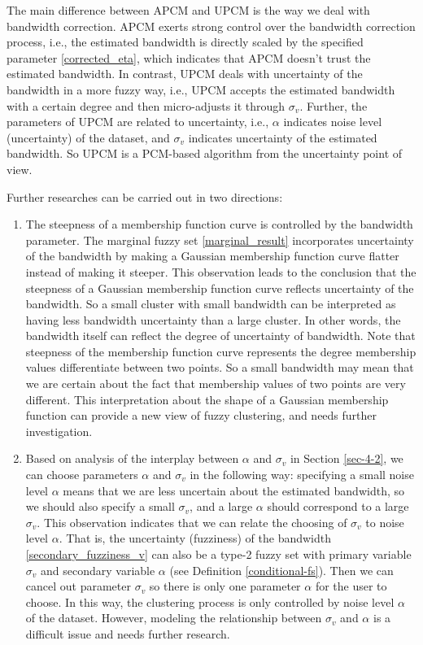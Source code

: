 \documentclass[journal,transmag]{IEEEtran}
\begin{document}
The main difference between APCM and UPCM is the way we deal with bandwidth correction.
APCM exerts strong control over the bandwidth correction process, i.e., the estimated bandwidth is directly scaled by the specified parameter \eqref{corrected_eta}, which indicates that APCM doesn't trust the estimated bandwidth. In contrast, UPCM deals with uncertainty of the bandwidth in a more fuzzy way, i.e., UPCM accepts the estimated bandwidth with a certain degree and then micro-adjusts it through $\sigma_v$. Further, the parameters of UPCM are related to uncertainty, i.e., $\alpha$ indicates noise level (uncertainty) of the dataset, and $\sigma_v$ indicates uncertainty of the estimated bandwidth. So UPCM is a PCM-based algorithm from the uncertainty point of view.

Further researches can be carried out in two directions:
\begin{enumerate}
\item The steepness of a membership function curve is controlled by the bandwidth parameter. The marginal fuzzy set \eqref{marginal_result} incorporates uncertainty of the bandwidth by making a Gaussian membership function curve flatter instead of making it steeper.
This observation leads to the conclusion that the steepness of a Gaussian membership function curve reflects uncertainty of the bandwidth. So a small cluster with small bandwidth can be interpreted as having less bandwidth uncertainty than a large cluster. In other words, the bandwidth itself can reflect the degree of uncertainty of bandwidth. Note that steepness of the membership function curve represents the degree membership values differentiate between two points. So a small bandwidth may mean that we are certain about the fact that membership values of two points are very different. This interpretation about the shape of a Gaussian  membership function can provide a new view of fuzzy clustering, and needs further investigation.
\item Based on analysis of the interplay between $\alpha$ and $\sigma_v$ in Section \ref{sec-4-2}, we can choose parameters $\alpha$ and $\sigma_v$ in the following way: specifying a small noise level $\alpha$ means that we are less uncertain about the estimated bandwidth, so we should also specify a small $\sigma_v$, and a large $\alpha$ should correspond to a large $\sigma_v$. This observation indicates that we can relate the choosing of $\sigma_v$ to noise level $\alpha$. That is, the uncertainty (fuzziness) of the bandwidth \eqref{secondary_fuzziness_v} can also be a type-2 fuzzy set with primary variable $\sigma_v$ and secondary variable $\alpha$ (see Definition \ref{conditional-fs}). Then we can cancel out  parameter $\sigma_v$ so there is only one parameter $\alpha$ for the user to choose. In this way, the clustering process is only controlled by noise level $\alpha$ of the dataset. However, modeling the relationship between $\sigma_v$ and $\alpha$ is a difficult issue and needs further research.
\end{enumerate}


\end{document}
